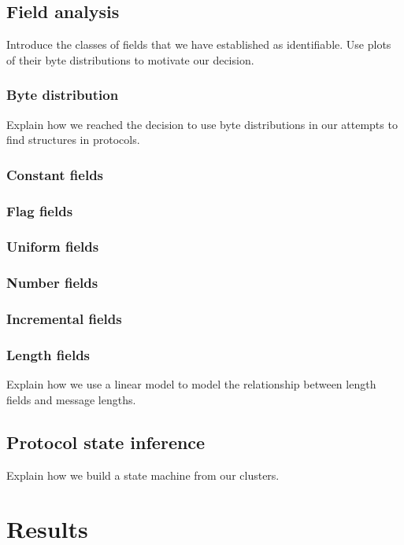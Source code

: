 \documentclass[a4paper]{report}
\begin{document}
\section{Field analysis}
Introduce the classes of fields that we have established as identifiable. Use
plots of their byte distributions to motivate our decision.

\subsection{Byte distribution}
Explain how we reached the decision to use byte distributions in our attempts
to find structures in protocols.

\subsection{Constant fields}

\subsection{Flag fields}

\subsection{Uniform fields}

\subsection{Number fields}

\subsection{Incremental fields}

\subsection{Length fields}
Explain how we use a linear model to model the relationship between length
fields and message lengths.

\section{Protocol state inference}
Explain how we build a state machine from our clusters.

\chapter{Results}
\end{document}
